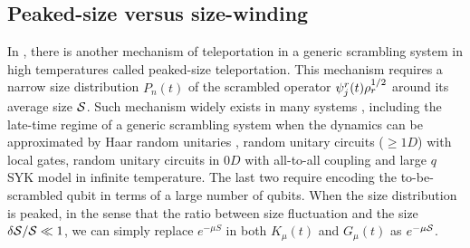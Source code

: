 \documentclass[11pt]{article}
\renewcommand{\>}{\rangle}
\newcommand{\<}{\langle}
\begin{document}
\subsection{Peaked-size versus size-winding \label{subsec:Average-size-and}}

In \cite{Schuster:2021uvg}, there is another mechanism of teleportation in a generic
scrambling system in high temperatures called peaked-size teleportation.
This mechanism requires a narrow size distribution $P_{n}(t)$ of
the scrambled operator $\psi_{j}^{r}(t)\rho_{r}^{1/2}$ around its average
size $\mathcal{S}$. Such mechanism widely exists in many systems \cite{Schuster:2021uvg},
including the late-time regime of a generic scrambling system when
the dynamics can be approximated by Haar random unitaries \cite{Hayden:2007cs, Roberts:2016hpo},
random unitary circuits ($\geq1D$) with local gates, random unitary
circuits in $0D$ with all-to-all coupling and large $q$ SYK model
in infinite temperature. The last two require encoding the to-be-scrambled
qubit in terms of a large number of qubits. When the size distribution
is peaked, in the sense that the ratio between size fluctuation and
the size $\delta\mathcal{S}/\mathcal{S}\ll1$, we can simply replace $e^{-\mu S}$ in
both $K_{\mu}(t)$ and $G_{\mu}(t)$ as $e^{-\mu\mathcal{S}}$.
\end{document}
